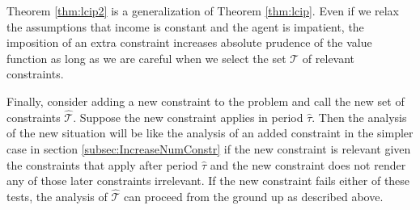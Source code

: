 Theorem \ref{thm:lcip2} is a generalization of Theorem \ref{thm:lcip}. Even if we relax the assumptions that income is constant and the agent is impatient, the imposition of an extra constraint increases absolute prudence of the value function as long as we are careful when we select the set $\mathcal{T}$ of relevant constraints.

Finally, consider adding a new constraint to the problem and call the new set of constraints $\hat{\mathcal{T}}$.  Suppose the new constraint applies in period $\hat{\tau}$.  Then the analysis of the new situation will be like the analysis of an added constraint in the simpler case in section \ref{subsec:IncreaseNumConstr} if the new constraint is relevant given the constraints that apply after period $\hat{\tau}$ and the new constraint does not render any of those later constraints irrelevant. If the new constraint fails either of these tests, the analysis of $\hat{\mathcal{T}}$ can proceed from the ground up as described above.

